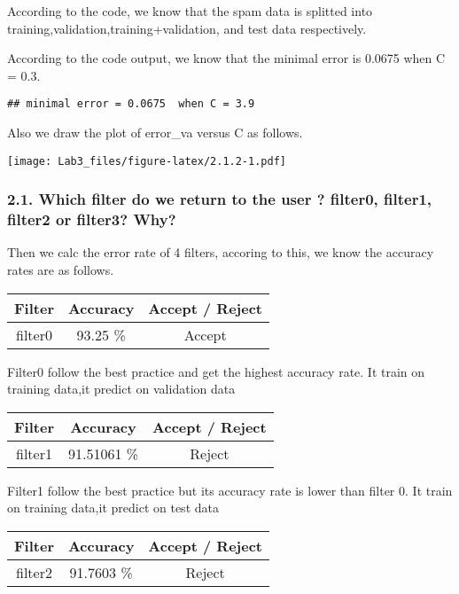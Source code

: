 \documentclass[
]{article}
\begin{document}
According to the code, we know that the spam data is splitted into
training,validation,training+validation, and test data respectively.

According to the code output, we know that the minimal error is 0.0675
when C = 0.3.

\begin{verbatim}
## minimal error = 0.0675  when C = 3.9
\end{verbatim}

Also we draw the plot of error\_va versus C as follows.

\texttt{[image: Lab3\_files/figure-latex/2.1.2-1.pdf]}

\subsubsection{2.1. Which filter do we return to the user ? filter0,
filter1, filter2 or filter3?
Why?}\label{which-filter-do-we-return-to-the-user-filter0-filter1-filter2-or-filter3-why}

Then we calc the error rate of 4 filters, accoring to this, we know the
accuracy rates are as follows.

\begin{longtable}[]{@{}ccc@{}}
\toprule\noalign{}
Filter & Accuracy & Accept / Reject \\
\midrule\noalign{}
\endhead
\bottomrule\noalign{}
\endlastfoot
filter0 & 93.25 \% & Accept \\
\end{longtable}

Filter0 follow the best practice and get the highest accuracy rate. It
train on training data,it predict on validation data

\begin{longtable}[]{@{}ccc@{}}
\toprule\noalign{}
Filter & Accuracy & Accept / Reject \\
\midrule\noalign{}
\endhead
\bottomrule\noalign{}
\endlastfoot
filter1 & 91.51061 \% & Reject \\
\end{longtable}

Filter1 follow the best practice but its accuracy rate is lower than
filter 0. It train on training data,it predict on test data

\begin{longtable}[]{@{}ccc@{}}
\toprule\noalign{}
Filter & Accuracy & Accept / Reject \\
\midrule\noalign{}
\endhead
\bottomrule\noalign{}
\endlastfoot
filter2 & 91.7603 \% & Reject \\
\end{longtable}
\end{document}
